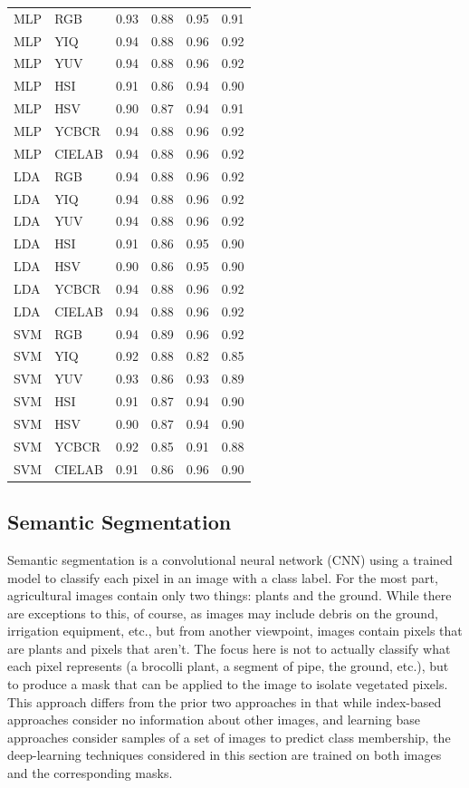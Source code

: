 \documentclass[letterpaper]{article}
\begin{document}
{\begin{longtable}{llrrrr}
\bottomrule
\endlastfoot
MLP &RGB & 0.93 &      0.88 &   0.95 & 0.91 \\
MLP &YIQ & 0.94 &      0.88 &   0.96 & 0.92 \\
MLP &YUV & 0.94 &      0.88 &   0.96 & 0.92 \\
MLP &HSI & 0.91 &      0.86 &   0.94 & 0.90 \\
MLP &HSV & 0.90 &      0.87 &   0.94 & 0.91 \\
MLP &YCBCR & 0.94 &      0.88 &   0.96 & 0.92 \\
MLP &CIELAB & 0.94 &      0.88 &   0.96 & 0.92 \\
LDA &RGB & 0.94 &      0.88 &   0.96 & 0.92 \\
LDA &YIQ & 0.94 &      0.88 &   0.96 & 0.92 \\
LDA &YUV & 0.94 &      0.88 &   0.96 & 0.92 \\
LDA &HSI & 0.91 &      0.86 &   0.95 & 0.90 \\
LDA &HSV & 0.90 &      0.86 &   0.95 & 0.90 \\
LDA &YCBCR & 0.94 &      0.88 &   0.96 & 0.92 \\
LDA &CIELAB & 0.94 &      0.88 &   0.96 & 0.92 \\
SVM &RGB & 0.94 &      0.89 &   0.96 & 0.92 \\
SVM &YIQ & 0.92 &      0.88 &   0.82 & 0.85 \\
SVM &YUV & 0.93 &      0.86 &   0.93 & 0.89 \\
SVM &HSI & 0.91 &      0.87 &   0.94 & 0.90 \\
SVM &HSV & 0.90 &      0.87 &   0.94 & 0.90 \\
SVM &YCBCR & 0.92 &      0.85 &   0.91 & 0.88 \\
SVM &CIELAB & 0.91 &      0.86 &   0.96 & 0.90 \\
\end{longtable}

% 
%
\subsection{Semantic Segmentation}
Semantic segmentation is a convolutional neural network (CNN) using a trained model to classify each pixel in an image with a class label.  For the most part, agricultural images contain only two things: plants and the ground. While there are exceptions to this, of course, as images may include debris on the ground, irrigation equipment, etc., but from another viewpoint, images contain pixels that are plants and pixels that aren't.  The focus here is not to actually classify what each pixel represents (a brocolli plant, a segment of pipe, the ground, etc.), but to produce a mask that can be applied to the image to isolate vegetated pixels. This approach differs from the prior two approaches in that while index-based approaches consider no information about other images, and learning base approaches consider samples of a set of images to predict class membership, the deep-learning techniques considered in this section are trained on both images and the corresponding masks.

}
\end{document}
